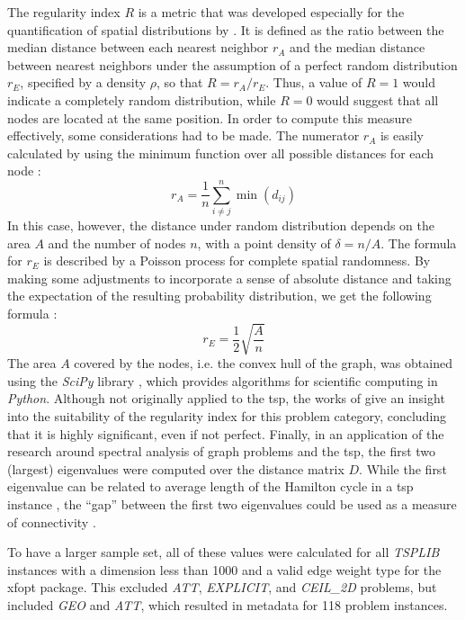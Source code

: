 The regularity index $R$ is a metric that was developed especially for the quantification of spatial distributions by \citet{clark1954distance}. It is defined as the ratio between the median distance between each nearest neighbor $r_A$ and the median distance between nearest neighbors under the assumption of a perfect random distribution $r_E$, specified by a density $\rho$, so that $R = r_A / r_E$.
Thus, a value of $R = 1$ would indicate a completely random distribution, while $R = 0$ would suggest that all nodes are located at the same position.
In order to compute this measure effectively, some considerations had to be made.
The numerator $r_A$ is easily calculated by using the minimum function over all possible distances for each node \cite{dry2012clustering}: 
\begin{equation}
	r_A = \frac{1}{n} \sum_{i \neq j}^{n} \min(d_{ij})
\end{equation}
In this case, however, the distance under random distribution depends on the area $A$ and the number of nodes $n$, with a point density of $\delta = n/A$. The formula for $r_E$ is described by a Poisson process for complete spatial randomness. By making some adjustments to incorporate a sense of absolute distance and taking the expectation of the resulting probability distribution, we get the following formula \cite{dry2012clustering}:
\begin{equation}
	r_E = \frac{1}{2} \sqrt{\frac{A}{n}}
\end{equation}
The area $A$ covered by the nodes, i.e. the convex hull of the graph, was obtained using the \textit{SciPy} library \cite{2020SciPy-NMeth}, which provides algorithms for scientific computing in \textit{Python}.
Although not originally applied to the \gls{tsp}, the works of \citet{dry2012clustering, cricsan2021randomness} give an insight into the suitability of the regularity index for this problem category, concluding that it is highly significant, even if not perfect. Finally, in an application of the research around spectral analysis of graph problems and the \gls{tsp}, the first two (largest) eigenvalues were computed over the distance matrix $D$. While the first eigenvalue can be related to average length of the Hamilton cycle in a \gls{tsp} instance \cite{cvetkovic2018traveling}, the \enquote{gap} between the first two eigenvalues could be used as a measure of connectivity \cite{lovasz20071}.

To have a larger sample set, all of these values were calculated for all \textit{TSPLIB} instances with a dimension less than 1000 and a valid edge weight type for the \gls{xfopt} package. This excluded \textit{ATT}, \textit{EXPLICIT}, and \textit{CEIL\_2D} problems, but included \textit{GEO} and \textit{ATT}, which resulted in metadata for 118 problem instances.

